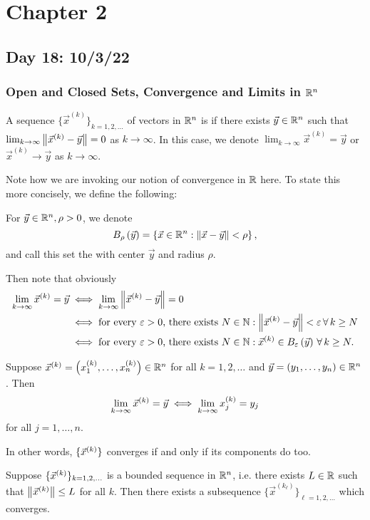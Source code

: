 \documentclass[main.tex]{subfiles}
\begin{document}
\section{Chapter 2}
\subsection{Day 18: 10/3/22}
\subsubsection{Open and Closed Sets, Convergence and Limits in $\RR^n$}

\begin{definition}[Convergence in $\RR^n$]
    A sequence $\{\vec{x}^{(k)}\}_{k = 1, 2, \ldots}$ of vectors in $\RR^n$ is  if there exists $\vec{y}\in \mathbb R^n$ such that $\lim_{k\to\infty} \left\lVert \vec{x}^{(k)} - \vec{y} \right\rVert = 0$ as $k\to\infty$. In this case, we denote $\lim_{k\to\infty} \vec{x}^{(k)} = \vec{y}$ or $\vec{x}^{(k)}\to\vec{y}$ as $k\to\infty$.
\end{definition}
Note how we are invoking our notion of convergence in $\mathbb R$ here. To state this more concisely, we define the following:

\begin{definition}
    For $\vec{y}\in \mathbb R^n, \rho > 0$, we denote
    \[B_\rho\left( \vec{y} \right) = \left\{\vec{x}\in \mathbb R^n : \left\lVert \vec{x} - \vec{y} \right\rVert < \rho\right\},\]
    and call this set the  with center $\vec{y}$ and radius $\rho$.
\end{definition}

Then note that obviously
\begin{align*}
\lim_{k\to\infty} \vec{x}^{(k)} = \vec{y} &\iff \lim_{k\to\infty} \left\lVert \vec{x}^{(k)} - \vec{y} \right\rVert = 0 \\
&\iff \text{for every } \varepsilon > 0\text{, there exists } N\in \mathbb N : \left\lVert \vec{x}^{(k)} - \vec{y} \right\rVert < \varepsilon\,\forall \,k\ge N \\
&\iff \text{for every } \varepsilon > 0\text{, there exists } N\in \mathbb N : \vec{x}^{(k)}\in B_\varepsilon\left( \vec{y} \right)\,\forall\, k\ge N.
\end{align*}

\begin{lemma}
    Suppose $\vec{x}^{(k)} = \left( x ^{(k)}_1, \ldots , x ^{(k)}_n \right)\in \mathbb R^n$ for all $k = 1, 2, \ldots$ and $\vec{y} = \left( y_1, \ldots , y_n \right)\in \mathbb R^n$. Then
    \[\lim_{k\to \infty} \vec{x}^{(k)} = \vec{y} \iff \lim_{k\to \infty} x ^{(k)}_j = y_j\]
    for all $j = 1, \ldots , n$.
\end{lemma}
In other words, $\{\vec{x}^{(k)}\}$ converges if and only if its components do too.
\begin{theorem}
    Suppose $\{\vec{x}^{(k)}\}_{k = 1, 2, \ldots}$ is a bounded sequence in $\RR^n$, i.e. there exists $L\in \mathbb R$ such that $\left\lVert \vec{x}^{(k)} \right\rVert \le L$ for all $k$. Then there exists a subsequence $\{\vec{x}^{(k_\ell)}\}_{\ell = 1, 2, \ldots}$ which converges.
\end{theorem}
\end{document}
